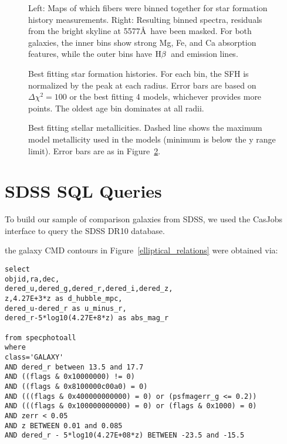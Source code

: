 \documentclass[12pt,preprint]{aastex}
\newcommand\hb{$\rm{H}\beta$}
\begin{document}
\begin{figure}
\caption{Left:  Maps of which fibers were binned together for star formation history measurements.
Right:  Resulting binned spectra, residuals from the bright skyline at 5577\AA\ have been masked.
For both galaxies, the inner bins show strong Mg, Fe, and Ca absorption features, while the outer bins have \hb\ and  emission lines. \label{gal_binmap}}
\end{figure}


\begin{figure}
\caption{ Best fitting star formation histories.
For each bin, the SFH is normalized by the peak at each radius.
Error bars are based on $\Delta\chi^2=100$ or the best fitting 4 models, whichever provides more points.
The oldest age bin dominates at all radii.
\label{sfh_gals} }
\end{figure}


\begin{figure}
\caption{Best fitting stellar metallicities.
 Dashed line shows the maximum model metallicity used in the models (minimum is below the y range limit).
Error bars are as in Figure~\ref{sfh_gals}.
\label{metal_gals}}
\end{figure}


\clearpage

\appendix
\section{SDSS SQL Queries} \label{SQL}
To build our sample of comparison galaxies from SDSS, we used the CasJobs interface to query the SDSS DR10 database.


the galaxy CMD contours in Figure~\ref{elliptical_relations} were obtained via:
\begin{verbatim}
select 
objid,ra,dec,
dered_u,dered_g,dered_r,dered_i,dered_z,
z,4.27E+3*z as d_hubble_mpc,
dered_u-dered_r as u_minus_r,
dered_r-5*log10(4.27E+8*z) as abs_mag_r 

from specphotoall
where
class='GALAXY'
AND dered_r between 13.5 and 17.7
AND ((flags & 0x10000000) != 0)
AND ((flags & 0x8100000c00a0) = 0)
AND (((flags & 0x400000000000) = 0) or (psfmagerr_g <= 0.2))
AND (((flags & 0x100000000000) = 0) or (flags & 0x1000) = 0)
AND zerr < 0.05
AND z BETWEEN 0.01 and 0.085
AND dered_r - 5*log10(4.27E+08*z) BETWEEN -23.5 and -15.5
\end{verbatim}
\end{document}
